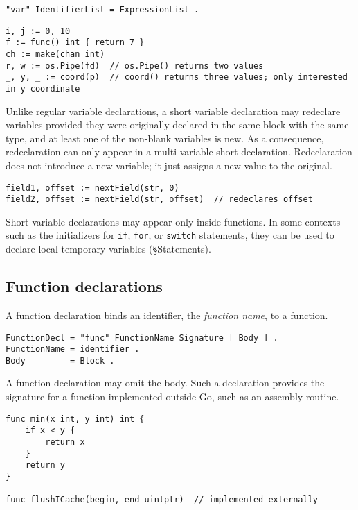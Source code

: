 \begin{Verbatim}[frame=single]
"var" IdentifierList = ExpressionList .
\end{Verbatim}

\begin{Verbatim}[frame=single]
i, j := 0, 10
f := func() int { return 7 }
ch := make(chan int)
r, w := os.Pipe(fd)  // os.Pipe() returns two values
_, y, _ := coord(p)  // coord() returns three values; only interested in y coordinate
\end{Verbatim}

Unlike regular variable declarations, a short variable declaration may
redeclare variables provided they were originally declared in the same
block with the same type, and at least one of the
non-blank variables is new. As a
consequence, redeclaration can only appear in a multi-variable short
declaration. Redeclaration does not introduce a new variable; it just
assigns a new value to the original.

\begin{Verbatim}[frame=single]
field1, offset := nextField(str, 0)
field2, offset := nextField(str, offset)  // redeclares offset
\end{Verbatim}

Short variable declarations may appear only inside functions. In some
contexts such as the initializers for \texttt{if}, \texttt{for}, or
\texttt{switch} statements, they can be used to declare local temporary
variables (§Statements).

\subsection*{Function declarations}

A function declaration binds an identifier, the \emph{function name}, to
a function.

\begin{Verbatim}[frame=single]
FunctionDecl = "func" FunctionName Signature [ Body ] .
FunctionName = identifier .
Body         = Block .
\end{Verbatim}

A function declaration may omit the body. Such a declaration provides
the signature for a function implemented outside Go, such as an assembly
routine.

\begin{Verbatim}[frame=single]
func min(x int, y int) int {
    if x < y {
        return x
    }
    return y
}

func flushICache(begin, end uintptr)  // implemented externally
\end{Verbatim}

